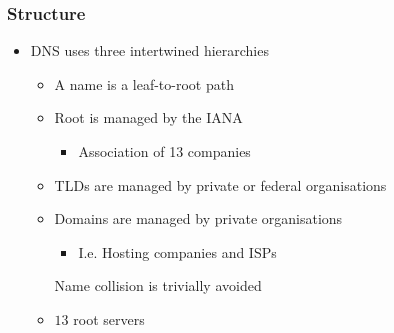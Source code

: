 \subsubsection{Structure}
\begin{itemize}
    \item DNS uses three intertwined hierarchies
        \begin{itemize}
                \begin{itemize}
                        \begin{itemize}
                            \item Imaginary dot after the TLD in the URL
                        \end{itemize}
                     Sit at the top
                     Subtree of the TLD
                     Subtree of domain
                        \begin{itemize}
                            \item Can be arbitrarily nested
                        \end{itemize}
                    \item A name is a leaf-to-root path
                \end{itemize}
                \begin{itemize}
                    \item Root is managed by the IANA
                        \begin{itemize}
                            \item Association of 13 companies
                        \end{itemize}
                    \item TLDs are managed by private or federal organisations
                    \item Domains are managed by private organisations
                        \begin{itemize}
                            \item I.e. Hosting companies and ISPs
                        \end{itemize}
                    \ipro Name collision is trivially avoided
                \end{itemize}
                \begin{itemize}
                    \item $13$ root servers

\end{itemize}
\end{itemize}
\end{itemize}
